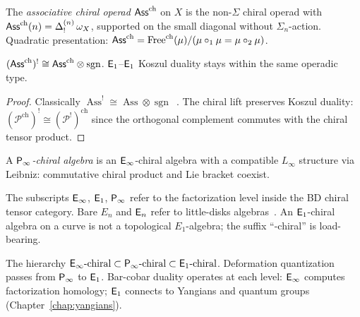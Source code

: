 \begin{definition}
\label{def:chiral-ass-operad}
The \emph{associative chiral operad} $\mathsf{Ass}^{\mathrm{ch}}$ on $X$ is the
non-$\Sigma$ chiral operad with
$\mathsf{Ass}^{\mathrm{ch}}(n) = \Delta^{(n)}_!\, \omega_X$, supported on the small
diagonal without $\Sigma_n$-action.  Quadratic presentation:
$\mathsf{Ass}^{\mathrm{ch}} = \operatorname{Free}^{\mathrm{ch}}(\mu) /
(\mu \circ_1 \mu = \mu \circ_2 \mu)$.
\end{definition}

\begin{proposition}
\label{prop:chirAss-self-dual}
$(\mathsf{Ass}^{\mathrm{ch}})^! \cong \mathsf{Ass}^{\mathrm{ch}} \otimes \operatorname{sgn}$.
$\mathsf{E}_1$--$\mathsf{E}_1$ Koszul duality stays within the same operadic
type.
\end{proposition}
\begin{proof}
Classically $\operatorname{Ass}^! \cong \operatorname{Ass} \otimes
\operatorname{sgn}$~\cite[Theorem~7.4.1]{LV12}.  The chiral lift
preserves Koszul duality:
$(\mathcal{P}^{\mathrm{ch}})^! \cong (\mathcal{P}^!)^{\mathrm{ch}}$
since the orthogonal complement commutes with the chiral tensor
product.
\end{proof}

\begin{definition}[\texorpdfstring{$\Pinf$}{P-infinity}-chiral algebra = chiral Poisson]
\label{def:pinf-chiral}
A \emph{$\Pinf$-chiral algebra} is an $\mathsf{E}_{\infty}$-chiral algebra with
a compatible $L_\infty$ structure via Leibniz: commutative chiral
product and Lie bracket coexist.
\end{definition}

\begin{remark}\label{rem:En-terminology}
The subscripts $\mathsf{E}_{\infty}$, $\mathsf{E}_1$, $\Pinf$ refer to the
factorization level inside the BD chiral tensor category.  Bare
$E_n$ and $\mathsf{E}_n$ refer to little-disks
algebras~\cite[\S5.1]{HA}.  An $\mathsf{E}_1$-chiral algebra on a
curve is not a topological $E_1$-algebra; the suffix
``-chiral'' is load-bearing.
\end{remark}

The hierarchy
$\mathsf{E}_{\infty}\text{-chiral} \subset \mathsf{P}_{\infty}\text{-chiral} \subset
\mathsf{E}_1\text{-chiral}$.
Deformation quantization passes from $\Pinf$ to $\mathsf{E}_1$.
Bar-cobar duality operates at each level: $\mathsf{E}_{\infty}$ computes
factorization homology; $\mathsf{E}_1$ connects to Yangians and quantum
groups (Chapter~\ref{chap:yangians}).

